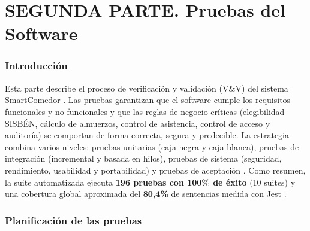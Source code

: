 \documentclass[stu,11pt,floatsintext]{apa7}
\begin{document}
\part*{SEGUNDA PARTE. Pruebas del Software}

\section{Introducción}
Esta parte describe el proceso de verificación y validación (V\&V) del sistema
SmartComedor \parencite{ieee829}. Las pruebas garantizan que el software cumple los
requisitos funcionales y no funcionales y que las reglas de negocio críticas
(elegibilidad SISBÉN, cálculo de almuerzos, control de asistencia, control de acceso y
auditoría) se comportan de forma correcta, segura y predecible. La estrategia combina
varios niveles: pruebas unitarias (caja negra y caja blanca), pruebas de integración
(incremental y basada en hilos), pruebas de sistema (seguridad, rendimiento, usabilidad y
portabilidad) y pruebas de aceptación \parencite{myers2011,pressman2014}. Como resumen,
la suite automatizada ejecuta \textbf{196 pruebas con 100\% de éxito} (10 suites) y una
cobertura global aproximada del \textbf{80,4\%} de sentencias medida con Jest
\parencite{jest}.

\section{Planificación de las pruebas}
\end{document}
